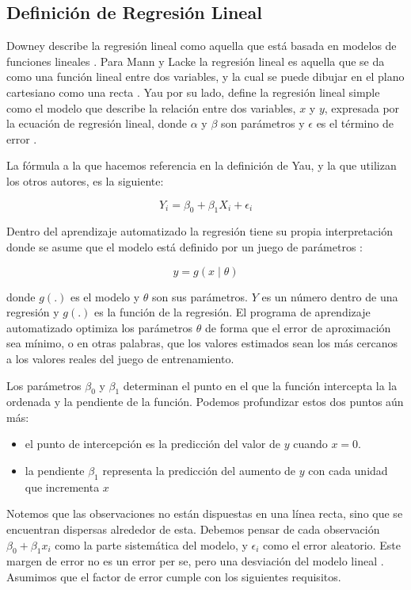 \begin{spacing}{1.5}
\subsection{Definición de Regresión Lineal}
Downey describe la regresión lineal como aquella que está basada en modelos de funciones lineales \cite{thinkStats}. Para Mann y Lacke la regresión lineal es aquella que se da como una función lineal entre dos variables, y la cual se puede dibujar en el plano cartesiano como una recta \cite{intoStats7}. Yau por su lado, define la regresión lineal simple como el modelo que describe la relación entre dos variables, $x$ y $y$, expresada por la ecuación de regresión lineal, donde $\alpha$ y $\beta$ son parámetros y $\epsilon$ es el término de error \cite{yau}.

La fórmula a la que hacemos referencia en la definición de Yau, y la que utilizan los otros autores, es la siguiente:

\[Y_{i} = \beta_{0} + \beta_{1}X_{i} + \epsilon_{i}\]

Dentro del aprendizaje automatizado la regresión tiene su propia interpretación donde se asume que el modelo está definido por un juego de parámetros \cite{alpaydin}:

\[ y = g(x \mid \theta) \]

donde $g(.)$ es el modelo y $\theta$ son sus parámetros. $Y$ es un número dentro de una regresión y $g(.)$ es la función de la regresión. El programa de aprendizaje automatizado optimiza los parámetros $\theta$ de forma que el error de aproximación sea mínimo, o en otras palabras, que los valores estimados sean los más cercanos a los valores reales del juego de entrenamiento. 

Los parámetros $\beta_{0}$ y $\beta_{1}$ determinan el punto en el que la función intercepta la la ordenada y la pendiente de la función. Podemos profundizar estos dos puntos aún más:
\begin{itemize}
	\item el punto de intercepción es la predicción del valor de $y$ cuando $x=0$. 
    \item la pendiente $\beta_{1}$ representa la predicción del aumento de $y$ con cada unidad que incrementa $x$
\end{itemize}

Notemos que las observaciones no están dispuestas en una línea recta, sino que se encuentran dispersas alrededor de esta. Debemos pensar de cada observación $\beta_{0} + \beta_{1}x_{i}$ como la parte sistemática del modelo, y $\epsilon_i$ como el error aleatorio. Este margen de error no es un error per se, pero una desviación del modelo lineal \cite{hyndman}. Asumimos que el factor de error cumple con los siguientes requisitos. 


\end{spacing}
